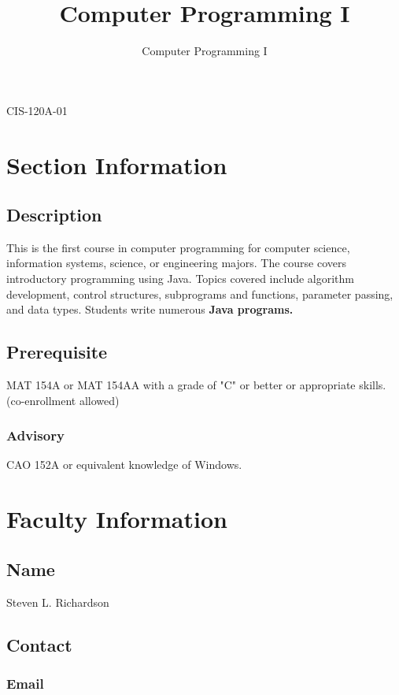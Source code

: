 \documentclass{article}
\renewcommand{\maketitle}{
\begin{center}
{\huge\bfseries
\theauthor}

\vspace{.25em}

CIS-120A-01

\end{center}
}
\begin{document}
\title{Computer Programming I}
\author{Computer Programming I}
\maketitle


\section{Section Information}

\subsection{Description}

This is the first course in computer programming for computer science, information systems, science, or engineering majors. The course covers introductory programming using Java. Topics covered include algorithm development, control structures, subprograms and functions, parameter passing, and data types. Students write numerous \textbf{Java programs.}

\subsection{Prerequisite}

MAT 154A or MAT 154AA with a grade of "C" or better or appropriate skills. (co-enrollment allowed) 

\subsubsection{Advisory}

CAO 152A or equivalent knowledge of Windows.

\section{Faculty Information}

\subsection{Name}

Steven L. Richardson

\subsection{Contact}

\subsubsection{Email}
\end{document}
